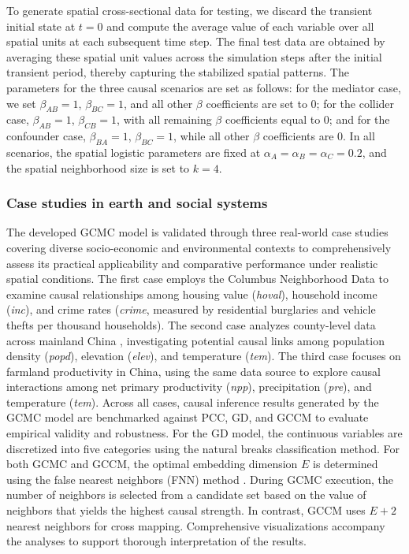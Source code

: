 \documentclass[authoryear,preprint,review,12pt]{elsarticle}
\begin{document}
To generate spatial cross-sectional data for testing, we discard the transient initial state at \(t=0\) and compute the average value of each variable over all spatial units at each subsequent time step. The final test data are obtained by averaging these spatial unit values across the simulation steps after the initial transient period, thereby capturing the stabilized spatial patterns. The parameters for the three causal scenarios are set as follows: for the mediator case, we set \(\beta_{AB}=1\), \(\beta_{BC}=1\), and all other \(\beta\) coefficients are set to $0$; for the collider case, \(\beta_{AB}=1\), \(\beta_{CB}=1\), with all remaining \(\beta\) coefficients equal to $0$; and for the confounder case, \(\beta_{BA}=1\), \(\beta_{BC}=1\), while all other \(\beta\) coefficients are $0$. In all scenarios, the spatial logistic parameters are fixed at \(\alpha_A = \alpha_B = \alpha_C = 0.2\), and the spatial neighborhood size is set to \(k=4\).

\subsubsection{Case studies in earth and social systems}

The developed GCMC model is validated through three real-world case studies covering diverse socio-economic and environmental contexts to comprehensively assess its practical applicability and comparative performance under realistic spatial conditions. The first case employs the Columbus Neighborhood Data \citep{r-spData} to examine causal relationships among housing value (\textit{hoval}), household income (\textit{inc}), and crime rates (\textit{crime}, measured by residential burglaries and vehicle thefts per thousand households). The second case analyzes county-level data across mainland China \citep{gao2023gccm}, investigating potential causal links among population density (\textit{popd}), elevation (\textit{elev}), and temperature (\textit{tem}). The third case focuses on farmland productivity in China, using the same data source \citep{gao2023gccm} to explore causal interactions among net primary productivity (\textit{npp}), precipitation (\textit{pre}), and temperature (\textit{tem}). Across all cases, causal inference results generated by the GCMC model are benchmarked against PCC, GD, and GCCM to evaluate empirical validity and robustness. For the GD model, the continuous variables are discretized into five categories using the natural breaks classification method. For both GCMC and GCCM, the optimal embedding dimension \(E\) is determined using the false nearest neighbors (FNN) method \citep{kennel1992fnn}. During GCMC execution, the number of neighbors is selected from a candidate set based on the value of neighbors that yields the highest causal strength. In contrast, GCCM uses \(E + 2\) nearest neighbors for cross mapping. Comprehensive visualizations accompany the analyses to support thorough interpretation of the results.
\end{document}

